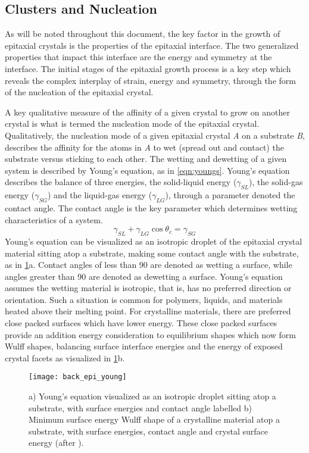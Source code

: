 \subsection{Clusters and Nucleation} As will be noted throughout this document, the key factor in the growth of epitaxial crystals is the properties of the epitaxial interface.
The two generalized properties that impact this interface are the energy and symmetry at the interface.
The initial stages of the epitaxial growth process is a key step which reveals the complex interplay of strain, energy and symmetry, through the form of the nucleation of the epitaxial crystal.

A key qualitative measure of the affinity of a given crystal to grow on another crystal is what is termed the nucleation mode of the epitaxial crystal.
Qualitatively, the nucleation mode of a given epitaxial crystal \emph{A} on a substrate \emph{B}, describes the affinity for the atoms in \emph{A} to wet (spread out and contact) the substrate versus sticking to each other.
The wetting and dewetting of a given system is described by Young's equation, as in \cref{eqn:youngs}.
Young's equation describes the balance of three energies, the solid-liquid energy (\(\gamma_{SL}\)), the solid-gas energy (\(\gamma_{SG}\)) and the liquid-gas energy (\(\gamma_{LG}\)), through a parameter denoted the contact angle.
The contact angle is the key parameter which determines wetting characteristics of a system.
\begin{equation}
 \gamma_{SL} + \gamma_{LG} \cos{\theta_c} = \gamma_{SG} \label{eqn:youngs}
\end{equation}
Young's equation can be visualized as an isotropic droplet of the epitaxial crystal material sitting atop a substrate, making some contact angle with the substrate, as in \cref{fig:back_epi_young}a.
Contact angles of less than 90\degree{} are denoted as wetting a surface, while angles greater than 90\degree{} are denoted as dewetting a surface.
Young's equation assumes the wetting material is isotropic, that is, has no preferred direction or orientation.
Such a situation is common for polymers, liquids, and materials heated above their melting point.
For crystalline materials, there are preferred close packed surfaces which have lower energy.
These close packed surfaces provide an addition energy consideration to equilibrium shapes which now form Wulff shapes, balancing surface interface energies and the energy of exposed crystal facets\cite{Venables1984} as visualized in \cref{fig:back_epi_young}b.
\begin{figure}
 \centering \texttt{[image: back\_epi\_young]}
 \caption[Young's equation]{\label{fig:back_epi_young}a) Young's equation visualized as an isotropic droplet sitting atop a substrate, with surface energies and contact angle labelled b) Minimum surface energy Wulff shape of a crystalline material atop a substrate, with surface energies, contact angle and crystal surface energy (after \cite{wikipedia_surface_energy}).}
\end{figure}

